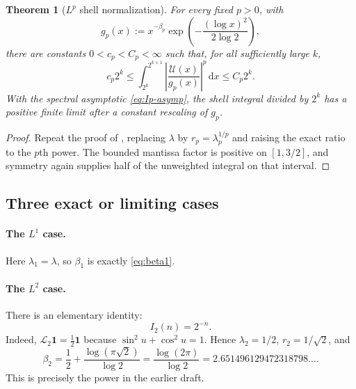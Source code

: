 \documentclass[11pt,oneside]{article}
\newtheorem{theorem}{Theorem}[section]
\theoremstyle{definition}
\theoremstyle{remark}
\newcommand{\dd}{\,\mathrm d}
\newcommand{\Uhat}{\mathcal U}
\newcommand{\Lop}{\mathcal L}
\begin{document}
\begin{theorem}[$L^p$ shell normalization]\label{thm:Lp-shell}
For every fixed $p>0$, with
\[
 g_p(x):=x^{-\beta_p}
 \exp\!\left(-\frac{(\log x)^2}{2\log2}\right),
\]
there are constants $0<c_p<C_p<\infty$ such that, for all sufficiently large $k$,
\begin{equation}\label{eq:Lp-shell-bound}
 c_p2^k\le
 \int_{2^k}^{2^{k+1}}
 \left|\frac{\Uhat(x)}{g_p(x)}\right|^p\dd x
 \le C_p2^k.
\end{equation}
With the spectral asymptotic \eqref{eq:Ip-asymp}, the shell integral divided by $2^k$
has a positive finite limit after a constant rescaling of $g_p$.
\end{theorem}

\begin{proof}
Repeat the proof of , replacing $\lambda$ by
$r_p=\lambda_p^{1/p}$ and raising the exact ratio to the $p$th power.  The bounded
mantissa factor is positive on $[1,3/2]$, and symmetry again supplies half of the
unweighted integral on that interval.
\end{proof}

\subsection{Three exact or limiting cases}

\paragraph{The $L^1$ case.}
Here $\lambda_1=\lambda$, so $\beta_1$ is exactly \eqref{eq:beta1}.

\paragraph{The $L^2$ case.}
There is an elementary identity:
\begin{equation}\label{eq:L2-exact}
 I_2(n)=2^{-n}.
\end{equation}
Indeed, $\Lop_2\mathbf1=\tfrac12\mathbf1$ because
$\sin^2u+\cos^2u=1$.  Hence $\lambda_2=1/2$,
$r_2=1/\sqrt2$, and
\begin{equation}\label{eq:beta2}
 \beta_2
 =\frac12+\frac{\log(\pi\sqrt2)}{\log2}
 =\frac{\log(2\pi)}{\log2}
 =2.651496129472318798\ldots .
\end{equation}
This is precisely the power in the earlier draft.
\end{document}
